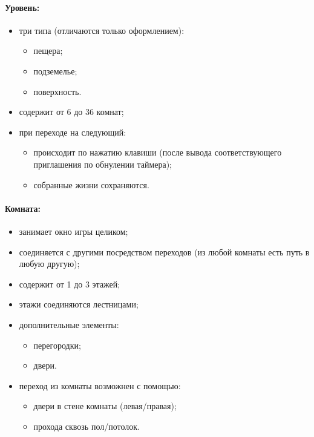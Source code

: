 \documentclass[12pt,a4paper,fullpage,titlepage]{article}
\begin{document}
\paragraph{Уровень:}
\begin{itemize}
	\item три типа (отличаются только оформлением):
	\begin{itemize}
		\item пещера;
		\item подземелье;
		\item поверхность.
	\end{itemize}
	\item содержит от 6 до 36 комнат;
	\item при переходе на следующий:
	\begin{itemize}
		\item происходит по нажатию клавиши (после вывода соответствующего приглашения по обнулении таймера);
		\item собранные жизни сохраняются.
	\end{itemize}
\end{itemize}

\paragraph{Комната:}
\begin{itemize}
	\item занимает окно игры целиком;
	\item соединяется с другими посредством переходов (из любой комнаты есть путь в любую другую);
	\item содержит от 1 до 3 этажей;
	\item этажи соединяются лестницами;
	\item дополнительные элементы:
	\begin{itemize}
		\item перегородки;
		\item двери.
	\end{itemize}
	\item переход из комнаты возможнен с помощью:
	\begin{itemize}
		\item двери в стене комнаты (левая/правая);
		\item прохода сквозь пол/потолок.
	\end{itemize}
\end{itemize}
\end{document}
